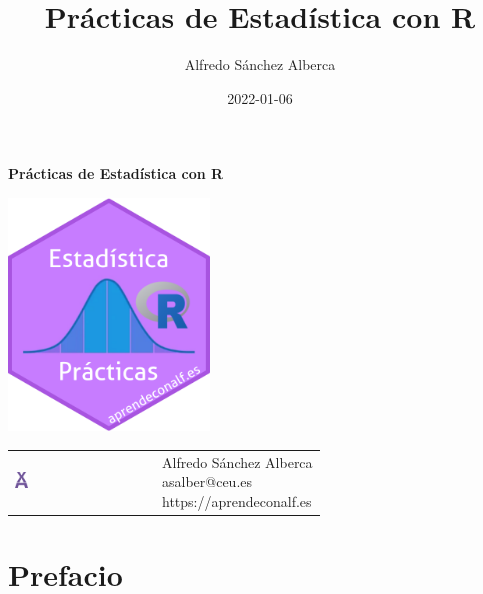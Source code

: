 \documentclass[
  a4paper,
]{scrreport}
\title{Prácticas de Estadística con R}
\author{Alfredo Sánchez Alberca}
\date{2022-01-06}
\renewcommand*\contentsname{Tabla de contenidos}
\newcommand\contentsname{Tabla de contenidos}
\theoremstyle{definition}
\theoremstyle{remark}
\begin{document}
\begin{titlepage}

\begin{center}
\vspace*{5cm}

\Huge
{\textbf{\textsf{Prácticas de Estadística con R}}}

\vspace{0.5cm}
\LARGE
{\textbf{\textsf{}}}

\vspace{1.5cm}

\includegraphics[width=0.4\textwidth]{img/logos/sticker-estadistica-r.png}
\end{center}

\vfill

\begin{flushleft}
\begin{tabular}{ll}
\includegraphics[width=0.1\textwidth]{img/logos/aprendeconalf.png} & \parbox[b]{5cm}{\Large\textsf{Alfredo
Sánchez
Alberca}\\ \textsf{asalber@ceu.es} \\ \textsf{https://aprendeconalf.es}}
\end{tabular}
\end{flushleft}
\end{titlepage}
\renewcommand*\contentsname{Tabla de contenidos}
{
\hypersetup{linkcolor=}
\setcounter{tocdepth}{2}
\tableofcontents
}


\chapter*{Prefacio}\label{prefacio}
\end{document}
